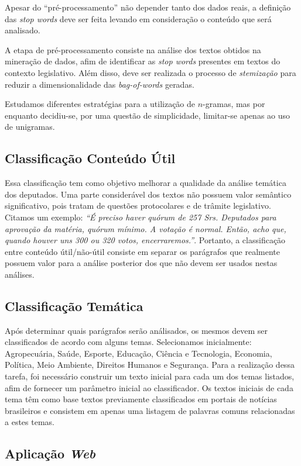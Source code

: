 Apesar do ``pré-processamento'' não depender tanto dos dados reais, a definição das \textit{stop words} deve ser feita levando em consideração o conteúdo que será analisado.

A etapa de pré-processamento consiste na análise dos textos obtidos na mineração de dados, afim de identificar as \textit{stop words} presentes em textos do contexto legislativo. Além disso, deve ser realizada o processo de \textit{stemização} para reduzir a dimensionalidade das \textit{bag-of-words} geradas.

Estudamos diferentes estratégias para a utilização de \(n\)-gramas, mas por enquanto decidiu-se, por uma questão de simplicidade, limitar-se apenas ao uso de unigramas.

\subsection{Classificação Conteúdo Útil}

Essa classificação tem como objetivo melhorar a qualidade da análise temática dos deputados. Uma parte considerável dos textos não possuem valor semântico significativo, pois tratam de questões protocolares e de trâmite legislativo. Citamos um exemplo: \textit{``É preciso haver quórum de 257 Srs. Deputados para aprovação da matéria, quórum mínimo. A votação é normal. Então, acho que, quando houver uns 300 ou 320 votos, encerraremos.''}. Portanto, a classificação entre conteúdo útil/não-útil consiste em separar os parágrafos que realmente possuem valor para a análise posterior dos que não devem ser usados nestas análises.

\subsection{Classificação Temática}

Após determinar quais parágrafos serão análisados, os mesmos devem ser classificados de acordo com alguns temas. Selecionamos inicialmente: Agropecuária, Saúde, Esporte, Educação, Ciência e Tecnologia, Economia, Política, Meio Ambiente, Direitos Humanos e Segurança. Para a realização dessa tarefa, foi necessário construir um texto inicial para cada um dos temas listados, afim de fornecer um parâmetro inicial ao classificador. Os textos iniciais de cada tema têm como base textos previamente classificados em portais de notícias brasileiros e consistem em apenas uma listagem de palavras comuns relacionadas a estes temas.

\subsection{Aplicação \textit{Web}}

